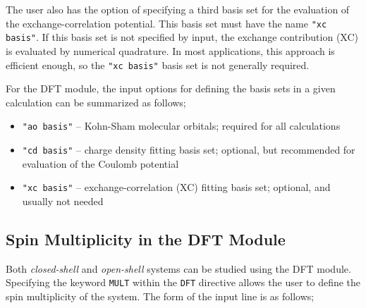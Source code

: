 The user also has the option of specifying a third basis set for the 
evaluation of the exchange-correlation potential.  This basis set must
have the name {\tt "xc basis"}.  If this basis set is not specified
by input, the exchange contribution (XC) is evaluated by numerical
quadrature.  In most applications, this approach is efficient enough,
so the {\tt "xc basis"} basis set is not generally required.

For the DFT module, the input options for defining the basis sets in a given
calculation can be summarized as follows;

\begin{itemize}
\item {\tt "ao basis"} -- Kohn-Sham molecular orbitals; required for all 
calculations

\item {\tt "cd basis"} -- charge density fitting basis set; optional, but
recommended for evaluation of the Coulomb potential

\item {\tt "xc basis"} -- exchange-correlation (XC) fitting basis set; 
optional, and usually not needed

\end{itemize}

\subsection{Spin Multiplicity in the DFT Module}

Both {\sl closed-shell} and {\sl open-shell} systems can be studied using
the DFT module.  Specifying the keyword \verb+MULT+ within the \verb+DFT+
directive allows the user to define the spin multiplicity of the system.
The form of the input line is as follows;

